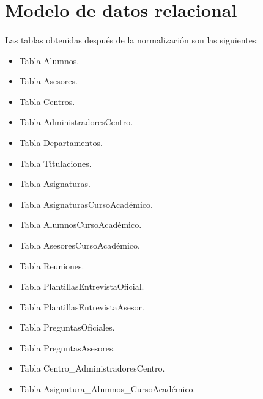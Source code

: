\section{Modelo de datos relacional}

  \paragraph{}Las tablas obtenidas después de la normalización son las
  siguientes:

  \begin{itemize}
   \item Tabla Alumnos.
   \item Tabla Asesores.
   \item Tabla Centros.
   \item Tabla AdministradoresCentro.
   \item Tabla Departamentos.
   \item Tabla Titulaciones.
   \item Tabla Asignaturas.
   \item Tabla AsignaturasCursoAcadémico.
   \item Tabla AlumnosCursoAcadémico.
   \item Tabla AsesoresCursoAcadémico.
   \item Tabla Reuniones.
   \item Tabla PlantillasEntrevistaOficial.
   \item Tabla PlantillasEntrevistaAsesor.
   \item Tabla PreguntasOficiales.
   \item Tabla PreguntasAsesores.
   \item Tabla Centro\_AdministradoresCentro.
   \item Tabla Asignatura\_Alumnos\_CursoAcadémico.
  \end{itemize}


















